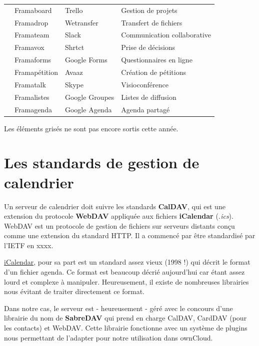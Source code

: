 \documentclass[10pt,a4paper, twoside]{report}
\begin{document}
{\begin{tabular}{|c|l|l|l|}
		\cline{2-4}
		& Framaboard & Trello & Gestion de projets \\
		\cline{2-4}
		& Framadrop & Wetransfer & Transfert de fichiers \\
		\hline
		\parbox[t]{3mm}{} & Framateam & Slack & Communication collaborative \\
		& Framavox & Shrtct & Prise de décisions \\
		& Framaforms & Google Forms & Questionnaires en ligne \\
		& Framapétition & Avaaz & Création de pétitions \\
		& Framatalk & Skype & Visioconférence \\
		& Framalistes & Google Groupes & Listes de diffusion \\
		& Framagenda & Google Agenda & Agenda partagé \\
		\hline 
		\end{tabular}}
	
	Les éléments grisés ne sont pas encore sortis cette année.
	\section{Les standards de gestion de calendrier}
	Un serveur de calendrier doit suivre les standards \textbf{CalDAV}, qui est une extension du protocole \textbf{WebDAV} appliquée aux fichiers \textbf{iCalendar} (\textit{.ics}). WebDAV est un protocole de gestion de fichiers sur serveurs distants conçu comme une extension du standard HTTP. Il a commencé par être standardisé par l'IETF en xxxx.
	
	\href{https://tools.ietf.org/html/rfc2445}{iCalendar}, pour sa part est un standard assez vieux (1998 !) qui décrit le format d'un fichier agenda. Ce format est beaucoup décrié aujourd'hui car étant assez lourd et complexe à manipuler. Heureusement, il existe de nombreuses librairies nous évitant de traiter directement ce format.
	
	Dans notre cas, le serveur est - heureusement - géré avec le concours d'une librairie du nom de \textbf{SabreDAV} qui prend en charge CalDAV, CardDAV (pour les contacts) et WebDAV. Cette librairie fonctionne avec un système de plugins nous permettant de l'adapter pour notre utilisation dans ownCloud.
	
\end{document}
